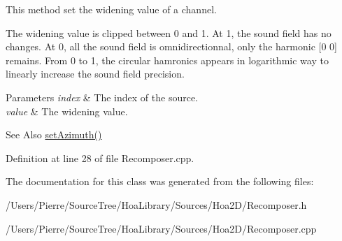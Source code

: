 This method set the widening value of a channel. 

The widening value is clipped between 0 and 1. At 1, the sound field has no changes. At 0, all the sound field is omnidirectionnal, only the harmonic \mbox{[}0 0\mbox{]} remains. From 0 to 1, the circular hamronics appears in logarithmic way to linearly increase the sound field precision.


\begin{DoxyParams}{Parameters}
{\em index} & The index of the source. \\
\hline
{\em value} & The widening value. \\
\hline
\end{DoxyParams}
\begin{DoxySeeAlso}{See Also}
\hyperlink{class_hoa2_d_1_1_recomposer_a2c1827fa0b25648b787077469e52a820}{set\-Azimuth()} 
\end{DoxySeeAlso}


Definition at line 28 of file Recomposer.\-cpp.



The documentation for this class was generated from the following files\-:\begin{DoxyCompactItemize}
\item 
/\-Users/\-Pierre/\-Source\-Tree/\-Hoa\-Library/\-Sources/\-Hoa2\-D/Recomposer.\-h\item 
/\-Users/\-Pierre/\-Source\-Tree/\-Hoa\-Library/\-Sources/\-Hoa2\-D/Recomposer.\-cpp\end{DoxyCompactItemize}
